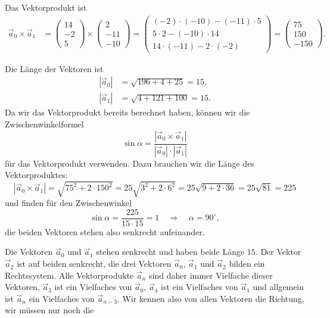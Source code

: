 \begin{loesung}
\begin{teilaufgaben}
\item
Das Vektorprodukt ist
\begin{align*}
\vec{a}_0\times\vec{a}_1
&=
\begin{pmatrix} 14\\-2\\5 \end{pmatrix}
\times
\begin{pmatrix} 2\\-11\\-10 \end{pmatrix}
=
\begin{pmatrix}
(-2)\cdot(-10)-(-11)\cdot 5 \\
5\cdot 2 - (-10)\cdot 14 \\
14\cdot(-11) -2\cdot(-2)
\end{pmatrix}
=
\begin{pmatrix}
75\\150\\-150
\end{pmatrix}.
\end{align*}
\item
Die Länge der Vektoren ist
\begin{align*}
|\vec{a}_0|
&=
\sqrt{196+4+25} = 15,
\\
|\vec{a}_1|
&=
\sqrt{4+121+100}=15.
\end{align*}
Da wir das Vektorprodukt bereits berechnet haben, können wir die 
Zwischenwinkelformel 
\[
\sin\alpha = \frac{|\vec{a}_0\times \vec{a}_1|}{|\vec{a}_0|\cdot |\vec{a}_1|}
\]
für das Vektorprodukt verwenden.
Dazu brauchen wir die Länge des Vektorproduktes:
\[
|\vec{a}_0\times\vec{a}_1|
=
\sqrt{75^2 + 2 \cdot 150^2}
=
25\sqrt{3^2 + 2\cdot 6^2}
=
25\sqrt{9+2\cdot 36}
=
25\sqrt{81}
=
225
\]
und finden für den Zwischenwinkel
\[
\sin\alpha = \frac{225}{15\cdot 15} = 1
\quad\Rightarrow\quad
\alpha = 90^\circ,
\]
die beiden Vektoren stehen also senkrecht aufeinander.
\item
Die Vektoren $\vec{a}_0$ und $\vec{a}_1$ stehen senkrecht und haben
beide Länge $15$.
Der Vektor $\vec{a}_2$ ist auf beiden senkrecht, die drei Vektoren
$\vec{a}_0$, $\vec{a}_1$ und $\vec{a}_2$ bilden ein Rechtssystem.
Alle Vektorprodukte $\vec{a}_n$ sind daher immer Vielfache dieser Vektoren,
$\vec{a}_3$ ist ein Vielfaches von $\vec{a}_0$, $\vec{a}_4$ ist ein
Vielfaches von $\vec{a}_1$ und allgemein ist 
$\vec{a}_n$ ein Vielfaches von $\vec{a}_{n-3}$.
Wir kennen also von allen Vektoren die Richtung, wir müssen nur noch die

\end{teilaufgaben}
\end{loesung}
